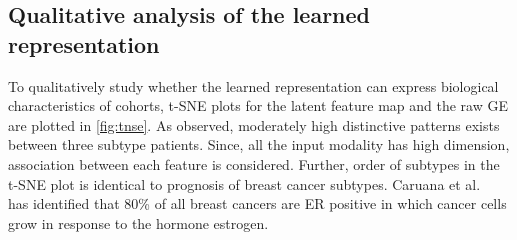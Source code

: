 \subsection{Qualitative analysis of the learned representation}
To qualitatively study whether the learned representation can express biological characteristics of cohorts, t-SNE plots for the latent feature map and the raw GE are plotted in \cref{fig:tnse}. As observed, moderately high distinctive patterns exists between three subtype patients. Since, all the input modality has high dimension, association between each feature is considered. Further, order of subtypes in the t-SNE plot is identical to prognosis of breast cancer subtypes. Caruana et al.~\cite{91Caruana} has identified that 80\% of all breast cancers are ER positive in which cancer cells grow in response to the hormone estrogen. 

